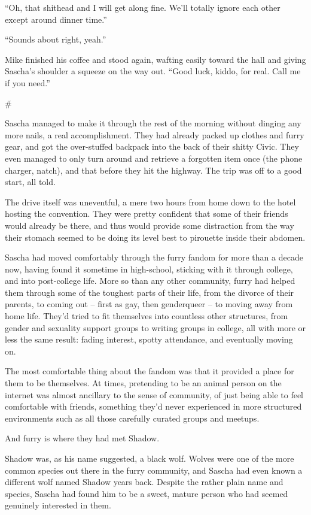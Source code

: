 \documentclass[12pt,letterpaper,oneside]{memoir}
\newcommand\secdiv{
  \begin{center}
    \#
  \end{center}
}
\begin{document}
  ``Oh, that shithead and I will get along fine. We'll totally ignore each other except around dinner time.''

  ``Sounds about right, yeah.''

  Mike finished his coffee and stood again, wafting easily toward the hall and giving Sascha's shoulder a squeeze on the way out. ``Good luck, kiddo, for real. Call me if you need.''

  \secdiv

  Sascha managed to make it through the rest of the morning without dinging any more nails, a real accomplishment. They had already packed up clothes and furry gear, and got the over-stuffed backpack into the back of their shitty Civic. They even managed to only turn around and retrieve a forgotten item once (the phone charger, natch), and that before they hit the highway. The trip was off to a good start, all told.

  The drive itself was uneventful, a mere two hours from home down to the hotel hosting the convention. They were pretty confident that some of their friends would already be there, and thus would provide some distraction from the way their stomach seemed to be doing its level best to pirouette inside their abdomen.

  Sascha had moved comfortably through the furry fandom for more than a decade now, having found it sometime in high-school, sticking with it through college, and into post-college life. More so than any other community, furry had helped them through some of the toughest parts of their life, from the divorce of their parents, to coming out -- first as gay, then genderqueer -- to moving away from home life. They'd tried to fit themselves into countless other structures, from gender and sexuality support groups to writing groups in college, all with more or less the same result: fading interest, spotty attendance, and eventually moving on.

  The most comfortable thing about the fandom was that it provided a place for them to be themselves. At times, pretending to be an animal person on the internet was almost ancillary to the sense of community, of just being able to feel comfortable with friends, something they'd never experienced in more structured environments such as all those carefully curated groups and meetups.

  And furry is where they had met Shadow.

  Shadow was, as his name suggested, a black wolf. Wolves were one of the more common species out there in the furry community, and Sascha had even known a different wolf named Shadow years back. Despite the rather plain name and species, Sascha had found him to be a sweet, mature person who had seemed genuinely interested in them.
\end{document}
